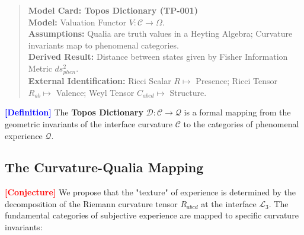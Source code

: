 \documentclass[11pt,titlepage]{article}
\newcommand{\interface}{\mathcal{L}_3}
\newcommand{\curvature}{\mathcal{C}}
\newcommand{\classifier}{\Omega}
\newcommand{\tagdef}{\textcolor{blue}{\textbf{[Definition]}} }
\newcommand{\tagconj}{\textcolor{red}{\textbf{[Conjecture]}} }
\begin{document}
\begin{quote}
\textbf{Model Card: Topos Dictionary (TP-001)} \\
\textbf{Model:} Valuation Functor $V: \curvature \to \classifier$. \\
\textbf{Assumptions:} Qualia are truth values in a Heyting Algebra; Curvature invariants map to phenomenal categories. \\
\textbf{Derived Result:} Distance between states given by Fisher Information Metric $ds^2_{phen}$. \\
\textbf{External Identification:} Ricci Scalar $R \mapsto$ Presence; Ricci Tensor $R_{ab} \mapsto$ Valence; Weyl Tensor $C_{abcd} \mapsto$ Structure.
\end{quote}

\label{sec:topos_dictionary}
\tagdef The \textbf{Topos Dictionary} $\mathcal{D}: \curvature \to \mathcal{Q}$ is a formal mapping from the geometric invariants of the interface curvature $\curvature$ to the categories of phenomenal experience $\mathcal{Q}$.

\subsection{The Curvature-Qualia Mapping}
\tagconj We propose that the "texture" of experience is determined by the decomposition of the Riemann curvature tensor $R_{abcd}$ at the interface $\interface$. The fundamental categories of subjective experience are mapped to specific curvature invariants:
\end{document}
